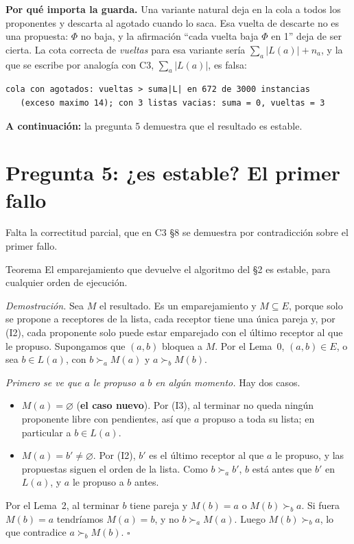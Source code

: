 \documentclass[11pt]{article}
\begin{document}
\textbf{Por qué importa la guarda.} Una variante natural deja en la cola a todos los proponentes y descarta al
agotado cuando lo saca. Esa vuelta de descarte no es una propuesta: $\Phi$ no baja, y la afirmación ``cada vuelta
baja $\Phi$ en 1'' deja de ser cierta. La cota correcta de \emph{vueltas} para esa variante sería
$\sum_a|L(a)|+n_a$, y la que se escribe por analogía con C3, $\sum_a|L(a)|$, es falsa:
\begin{lstlisting}[style=salida,basicstyle=\ttfamily\footnotesize\color{black},columns=fixed]
cola con agotados: vueltas > suma|L| en 672 de 3000 instancias
   (exceso maximo 14); con 3 listas vacias: suma = 0, vueltas = 3
\end{lstlisting}
\textbf{A continuación:} la pregunta 5 demuestra que el resultado es estable.

\section{Pregunta 5: ¿es estable? El primer fallo}

Falta la correctitud parcial, que en C3 §8 se demuestra por contradicción sobre el primer fallo.

\begin{resultado}{Teorema}
El emparejamiento que devuelve el algoritmo del §2 es estable, para cualquier orden de ejecución.
\end{resultado}

\textit{Demostración.} Sea $M$ el resultado. Es un emparejamiento y $M\subseteq E$, porque solo se propone a
receptores de la lista, cada receptor tiene una única pareja y, por (I2), cada proponente solo puede estar
emparejado con el último receptor al que le propuso. Supongamos que $(a,b)$ bloquea a $M$. Por el
Lema~0, $(a,b)\in E$, o sea $b\in L(a)$, con $b\succ_aM(a)$ y $a\succ_bM(b)$.

\emph{Primero se ve que $a$ le propuso a $b$ en algún momento.} Hay dos casos.
\begin{itemize}[leftmargin=14pt,itemsep=2pt]
\item $M(a)=\varnothing$ (\textbf{el caso nuevo}). Por (I3), al terminar no queda ningún proponente libre con
pendientes, así que $a$ propuso a toda su lista; en particular a $b\in L(a)$.
\item $M(a)=b'\ne\varnothing$. Por (I2), $b'$ es el último receptor al que $a$ le propuso, y las propuestas
siguen el orden de la lista. Como $b\succ_ab'$, $b$ está antes que $b'$ en $L(a)$, y $a$ le propuso a $b$ antes.
\end{itemize}
Por el Lema~2, al terminar $b$ tiene pareja y $M(b)=a$ o $M(b)\succ_ba$. Si fuera $M(b)=a$ tendríamos $M(a)=b$,
y no $b\succ_aM(a)$. Luego $M(b)\succ_ba$, lo que contradice $a\succ_bM(b)$. $\square$
\end{document}
